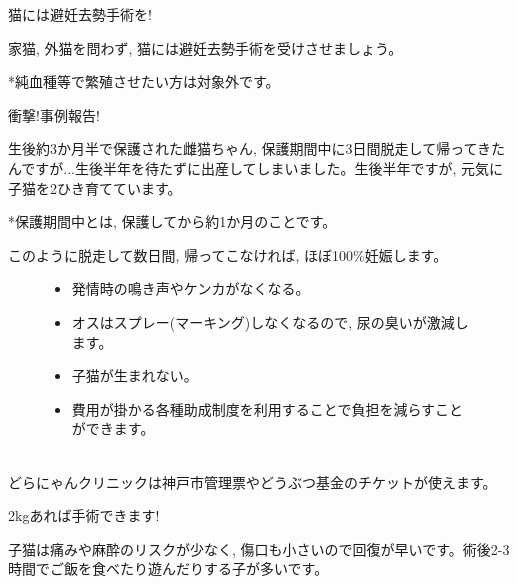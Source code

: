 \documentclass{jsarticle}
\begin{document}
\Huge
  猫には避妊去勢手術を!

\Large
  家猫, 外猫を問わず, 猫には避妊去勢手術を受けさせましょう。

  *純血種等で繁殖させたい方は対象外です。

  衝撃!事例報告!

  生後約3か月半で保護された雌猫ちゃん, 保護期間中に3日間脱走して帰ってきたんですが...生後半年を待たずに出産してしまいました。生後半年ですが, 元気に子猫を2ひき育てています。

  *保護期間中とは, 保護してから約1か月のことです。

	このように脱走して数日間, 帰ってこなければ, ほぼ100\%妊娠します。

	\begin{figure}[htbp]
		\Large
		\centering
		\begin{minipage}{0.4\columnwidth}
			\begin{itemize}
				\item 発情時の鳴き声やケンカがなくなる。
				\item オスはスプレー(マーキング)しなくなるので, 尿の臭いが激減します。
				\item 子猫が生まれない。
			\end{itemize}
		\end{minipage}
		\begin{minipage}{0.4\columnwidth}
			\begin{itemize}
				\item 費用が掛かる各種助成制度を利用することで負担を減らすことができます。\\\\
			\end{itemize}
		\end{minipage}
	\end{figure}

  どらにゃんクリニックは神戸市管理票やどうぶつ基金のチケットが使えます。




\newpage
\Huge
  2\si{\kilogram}あれば手術できます!

\Large
  子猫は痛みや麻酔のリスクが少なく, 傷口も小さいので回復が早いです。術後2-3時間でご飯を食べたり遊んだりする子が多いです。
\end{document}
